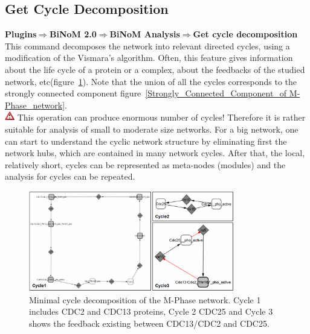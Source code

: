 \subsection{Get Cycle Decomposition}
\textbf{Plugins$\Rightarrow$BiNoM 2.0$\Rightarrow$BiNoM Analysis$\Rightarrow$Get cycle decomposition}\\
This command decomposes the network into relevant directed cycles\cite{gleiss2001relevant}, using a modification of the Vismara’s algorithm\cite{vismara1997union}. Often, this feature gives information about the life cycle of a protein or a complex, about the feedbacks of the studied network, etc(figure~\ref{Minimal_cycle_decomposition_of_the M-Phase}). Note that the union of all the cycles corresponds to the strongly connected component figure~\ref{Strongly_Connected_Component_of M-Phase_network}.\\
\includegraphics[width=12pt,height=12pt]{graphics/warning} This operation can produce enormous number of cycles! Therefore it is rather suitable for analysis of small to moderate size networks. For a big network, one can start to understand the cyclic network structure by eliminating first the network hubs, which are contained in many network cycles. After that, the local, relatively short, cycles can be represented as meta-nodes (modules) and the analysis for cycles can be repeated.\\
\begin{figure}
\centering
\includegraphics[width=0.8\textwidth]{graphics/Minimal_cycle_decomposition_of_the_M-Phase}
\caption{Minimal cycle decomposition of the M-Phase network.  Cycle 1 includes CDC2 and CDC13 proteins, Cycle 2 CDC25 and Cycle 3 shows the feedback existing between CDC13/CDC2 and CDC25.}
\label{Minimal_cycle_decomposition_of_the M-Phase}
\end{figure}

